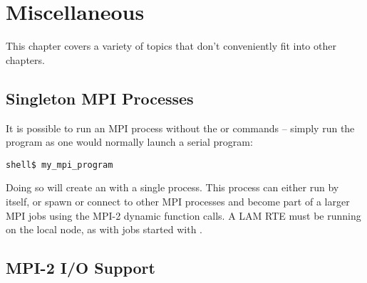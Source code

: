 %
% 
%
%

\chapter{Miscellaneous}
\label{sec:misc}

This chapter covers a variety of topics that don't conveniently fit
into other chapters.


\section{Singleton MPI Processes}

It is possible to run an MPI process without the  or
 commands -- simply run the program as one would normally
launch a serial program:

\lstset{style=lam-cmdline}
\begin{lstlisting}
shell$ my_mpi_program
\end{lstlisting}

Doing so will create an  with a single
process.  This process can either run by itself, or spawn or connect
to other MPI processes and become part of a larger MPI jobs using the
MPI-2 dynamic function calls.  A LAM RTE must be running on the local
node, as with jobs started with .


\section{MPI-2 I/O Support}

